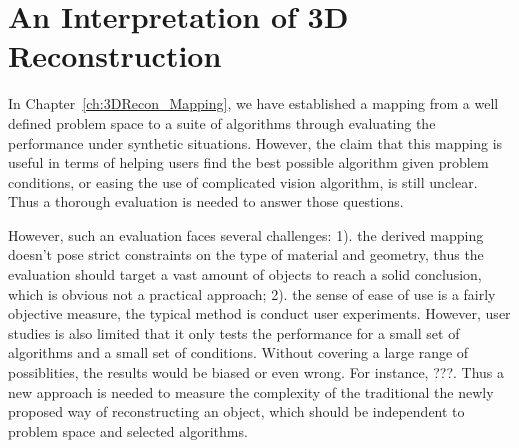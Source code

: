 
\chapter{An Interpretation of 3D Reconstruction}
\label{ch:3DRecon_Interp}
In Chapter~\ref{ch:3DRecon_Mapping}, we have established a mapping from a well defined problem space to a suite of algorithms through evaluating the performance under synthetic situations. However, the claim that this mapping is useful in terms of helping users find the best possible algorithm given problem conditions, or easing the use of complicated vision algorithm, is still unclear. Thus a thorough evaluation is needed to answer those questions.

However, such an evaluation faces several challenges: 1). the derived mapping doesn't pose strict constraints on the type of material and geometry, thus the evaluation should target a vast amount of objects to reach a solid conclusion, which is obvious not a practical approach; 2). the sense of ease of use is a fairly objective measure, the typical method is conduct user experiments. However, user studies is also limited that it only tests the performance for a small set of algorithms and a small set of conditions. Without covering a large range of possiblities, the results would be biased or even wrong. For instance, ???. Thus a new approach is needed to measure the complexity of the traditional the newly proposed way of reconstructing an object, which should be independent to problem space and selected algorithms.



